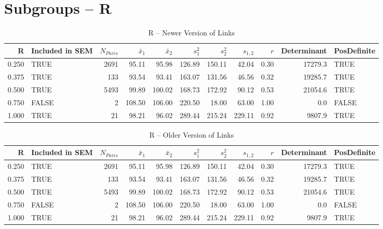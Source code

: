 \documentclass{article}\usepackage[]{graphicx}\usepackage[]{color}
\begin{document}
\section{Subgroups --  R }%
\begin{table}[ht]
\centering
\begin{tabular}{rlrrrrrrrrl}
  \hline
R & Included in SEM & $N_{Pairs}$ & $\bar{x}_1$ & $\bar{x}_2$ & $s_1^2$ & $s_2^2$ & $s_{1,2}$ & $r$ & Determinant & PosDefinite \\ 
  \hline
0.250 & TRUE & 2691 & 95.11 & 95.98 & 126.89 & 150.11 & 42.04 & 0.30 & 17279.3 & TRUE \\ 
  0.375 & TRUE & 133 & 93.54 & 93.41 & 163.07 & 131.56 & 46.56 & 0.32 & 19285.7 & TRUE \\ 
  0.500 & TRUE & 5493 & 99.89 & 100.02 & 168.73 & 172.92 & 90.12 & 0.53 & 21054.6 & TRUE \\ 
  0.750 & FALSE & 2 & 108.50 & 106.00 & 220.50 & 18.00 & 63.00 & 1.00 & 0.0 & FALSE \\ 
  1.000 & TRUE & 21 & 98.21 & 96.02 & 289.44 & 215.24 & 229.11 & 0.92 & 9807.9 & TRUE \\ 
   \hline
\end{tabular}
\caption{R -- Newer Version of Links} 
\end{table}
\begin{table}[ht]
\centering
\begin{tabular}{rlrrrrrrrrl}
  \hline
R & Included in SEM & $N_{Pairs}$ & $\bar{x}_1$ & $\bar{x}_2$ & $s_1^2$ & $s_2^2$ & $s_{1,2}$ & $r$ & Determinant & PosDefinite \\ 
  \hline
0.250 & TRUE & 2691 & 95.11 & 95.98 & 126.89 & 150.11 & 42.04 & 0.30 & 17279.3 & TRUE \\ 
  0.375 & TRUE & 133 & 93.54 & 93.41 & 163.07 & 131.56 & 46.56 & 0.32 & 19285.7 & TRUE \\ 
  0.500 & TRUE & 5493 & 99.89 & 100.02 & 168.73 & 172.92 & 90.12 & 0.53 & 21054.6 & TRUE \\ 
  0.750 & FALSE & 2 & 108.50 & 106.00 & 220.50 & 18.00 & 63.00 & 1.00 & 0.0 & FALSE \\ 
  1.000 & TRUE & 21 & 98.21 & 96.02 & 289.44 & 215.24 & 229.11 & 0.92 & 9807.9 & TRUE \\ 
   \hline
\end{tabular}
\caption{R -- Older Version of Links} 
\end{table}
\newpage 
\end{document}
